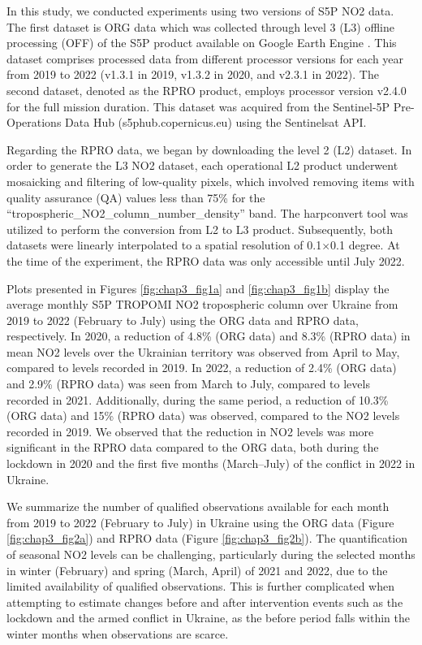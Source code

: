 In this study, we conducted experiments using two versions of S5P NO2 data. The first dataset is ORG data which was collected through level 3 (L3) offline processing (OFF) of the S5P product available on Google Earth Engine \citep{gorelick2017google}. This dataset comprises processed data from different processor versions for each year from 2019 to 2022 (v1.3.1 in 2019, v1.3.2 in 2020, and v2.3.1 in 2022). The second dataset, denoted as the RPRO product, employs processor version v2.4.0 for the full mission duration. This dataset was acquired from the Sentinel-5P Pre-Operations Data Hub (s5phub.copernicus.eu) using the Sentinelsat API.\par

Regarding the RPRO data, we began by downloading the level 2 (L2) dataset. In order to generate the L3 NO2 dataset, each operational L2 product underwent mosaicking and filtering of low-quality pixels, which involved removing items with quality assurance (QA) values less than 75\% for the \enquote{tropospheric\_NO2\_column\_number\_density} band. The harpconvert tool was utilized to perform the conversion from L2 to L3 product. Subsequently, both datasets were linearly interpolated to a spatial resolution of 0.1$\times$0.1 degree. At the time of the experiment, the RPRO data was only accessible until July 2022.\par

Plots presented in Figures \ref{fig:chap3_fig1a} and \ref{fig:chap3_fig1b} display the average monthly S5P TROPOMI NO2 tropospheric column over Ukraine from 2019 to 2022 (February to July) using the ORG data and RPRO data, respectively. In 2020, a reduction of 4.8\% (ORG data) and 8.3\% (RPRO data) in mean NO2 levels over the Ukrainian territory was observed from April to May, compared to levels recorded in 2019. In 2022, a reduction of 2.4\% (ORG data) and 2.9\% (RPRO data) was seen from March to July, compared to levels recorded in 2021. Additionally, during the same period, a reduction of 10.3\% (ORG data) and 15\% (RPRO data) was observed, compared to the NO2 levels recorded in 2019. We observed that the reduction in NO2 levels was more significant in the RPRO data compared to the ORG data, both during the lockdown in 2020 and the first five months (March–July) of the conflict in 2022 in Ukraine.\par

We summarize the number of qualified observations available for each month from 2019 to 2022 (February to July) in Ukraine using the ORG data (Figure \ref{fig:chap3_fig2a}) and RPRO data (Figure \ref{fig:chap3_fig2b}). The quantification of seasonal NO2 levels can be challenging, particularly during the selected months in winter (February) and spring (March, April) of 2021 and 2022, due to the limited availability of qualified observations. This is further complicated when attempting to estimate changes before and after intervention events such as the lockdown and the armed conflict in Ukraine, as the before period falls within the winter months when observations are scarce.\par

